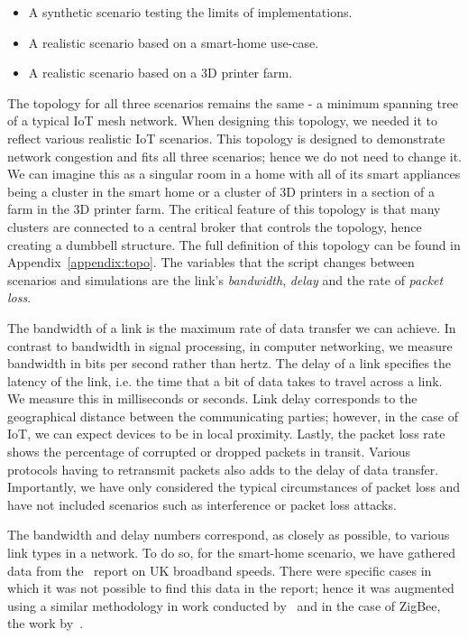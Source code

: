 \begin{itemize}
    \item A synthetic scenario testing the limits of implementations.
    \item A realistic scenario based on a smart-home use-case.
    \item A realistic scenario based on a 3D printer farm.
\end{itemize}

The topology for all three scenarios remains the same - a minimum spanning tree of a typical IoT mesh network.
When designing this topology, we needed it to reflect various realistic IoT scenarios.
This topology is designed to demonstrate network congestion and fits all three scenarios; hence we do not need to change it.
We can imagine this as a singular room in a home with all of its smart appliances being a cluster in the smart home or a cluster of 3D printers in a section of a farm in the 3D printer farm.
The critical feature of this topology is that many clusters are connected to a central broker that controls the topology, hence creating a dumbbell structure.
The full definition of this topology can be found in Appendix~\ref{appendix:topo}.
The variables that the script changes between scenarios and simulations are the link's \textit{bandwidth}, \textit{delay} and the rate of \textit{packet loss}.

The bandwidth of a link is the maximum rate of data transfer we can achieve.
In contrast to bandwidth in signal processing, in computer networking, we measure bandwidth in bits per second rather than hertz.
The delay of a link specifies the latency of the link, i.e. the time that a bit of data takes to travel across a link. 
We measure this in milliseconds or seconds.
Link delay corresponds to the geographical distance between the communicating parties; however, in the case of IoT, we can expect devices to be in local proximity.
Lastly, the packet loss rate shows the percentage of corrupted or dropped packets in transit.
Various protocols having to retransmit packets also adds to the delay of data transfer.
Importantly, we have only considered the typical circumstances of packet loss and have not included scenarios such as interference or packet loss attacks.

The bandwidth and delay numbers correspond, as closely as possible, to various link types in a network.
To do so, for the smart-home scenario, we have gathered data from the~\cite{ofcom_uk_2021} report on UK broadband speeds.
There were specific cases in which it was not possible to find this data in the report; hence it was augmented using a similar methodology in work conducted by~\cite{previdi_is-is_2019} and in the case of ZigBee, the work by~\citet{alena_fault_2011}.

